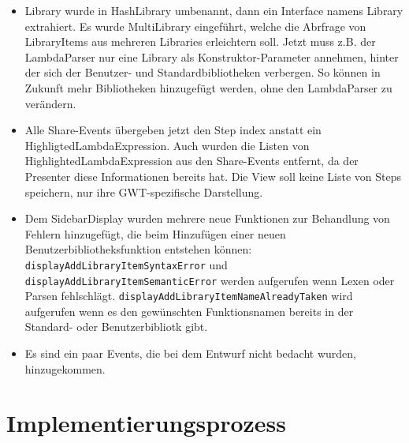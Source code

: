 \documentclass[parskip=full,11pt,twoside]{scrartcl}
\begin{document}
\begin{itemize}
    \item Library wurde in HashLibrary umbenannt, dann ein Interface namens Library extrahiert.
Es wurde MultiLibrary eingeführt, welche die Abrfrage von LibraryItems aus mehreren Libraries erleichtern soll.
Jetzt muss z.B. der LambdaParser nur eine Library als Konstruktor-Parameter annehmen, hinter der sich der Benutzer- und Standardbibliotheken verbergen.
So können in Zukunft mehr Bibliotheken hinzugefügt werden, ohne den LambdaParser zu verändern.
    \newline

    \item Alle Share-Events übergeben jetzt den Step index anstatt ein HighligtedLambdaExpression. Auch wurden die Listen von HighlightedLambdaExpression aus den Share-Events entfernt, da der Presenter diese Informationen bereits hat. Die View soll keine Liste von Steps speichern, nur ihre GWT-spezifische Darstellung.

    \item Dem SidebarDisplay wurden mehrere neue Funktionen zur Behandlung von Fehlern hinzugefügt, die beim Hinzufügen einer neuen Benutzerbibliotheksfunktion entstehen können:
    	\texttt{displayAddLibraryItemSyntaxError} und \newline
        \texttt{displayAddLibraryItemSemanticError} werden aufgerufen wenn Lexen oder Parsen fehlschlägt.
        \texttt{displayAddLibraryItemNameAlreadyTaken} wird aufgerufen wenn es den gewünschten Funktionsnamen bereits in der Standard- oder Benutzerbibliotk gibt.

    \item Es sind ein paar Events, die bei dem Entwurf nicht bedacht wurden, 	hinzugekommen.
\end{itemize}



\section{Implementierungsprozess}
\end{document}
